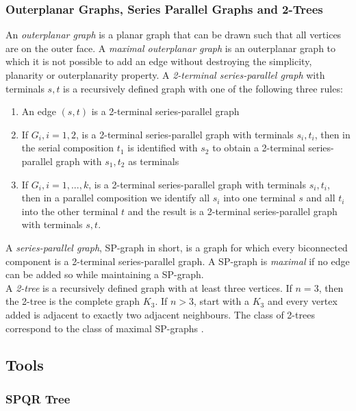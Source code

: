 \subsubsection{Outerplanar Graphs, Series Parallel Graphs and 2-Trees}
An \emph{outerplanar graph} is a planar graph that can be drawn such that all vertices are on the outer face. A \emph{maximal outerplanar graph} is an outerplanar graph to which it is not possible to add an edge without destroying the simplicity, planarity or outerplanarity property. 
A \emph{2-terminal series-parallel graph} with terminals $s,t$ is a recursively defined graph with one of the following three rules:
\begin{enumerate}
	\item An edge $(s,t)$ is a 2-terminal series-parallel graph
	\item If $G_i, i = 1,2$, is a 2-terminal series-parallel graph with terminals $s_i,t_i$, then in the serial composition $t_1$ is identified with $s_2$ to obtain a 2-terminal series-parallel graph with $s_1,t_2$ as terminals
	\item If $G_i, i=1,...,k$, is a 2-terminal series-parallel graph with terminals $s_i,t_i$, then in a parallel composition we identify all $s_i$ into one terminal $s$ and all $t_i$ into the other terminal $t$ and the result is a 2-terminal series-parallel graph with terminals $s,t$.
\end{enumerate}
A \emph{series-parallel graph}, SP-graph in short, is a graph for which every biconnected component is a 2-terminal series-parallel graph. A SP-graph is \emph{maximal} if no edge can be added so while maintaining a SP-graph. \cite[P. 143ff]{Biedl_SP}\\
A \emph{2-tree} is a recursively defined graph with at least three vertices. If $n = 3$, then the 2-tree is the complete graph $K_3$. If $n>3$, start with a $K_3$ and every vertex added is adjacent to exactly two adjacent neighbours. The class of 2-trees correspond to the class of maximal SP-graphs \cite[Page 2]{straight-line_2-trees}.
\subsection{Tools}
\subsubsection{SPQR Tree}

